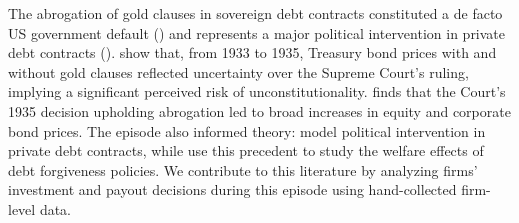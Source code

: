 The abrogation of gold clauses in sovereign debt contracts constituted a de facto US government default (\cite{Edwards2018}) and represents a major political intervention in private debt contracts (\cite{Bolton2002}). \cite{Edwards2015} show that, from 1933 to 1935, Treasury bond prices with and without gold clauses reflected uncertainty over the Supreme Court’s ruling, implying a significant perceived risk of unconstitutionality. \cite{Kroszner1999} finds that the Court's 1935 decision upholding abrogation led to broad increases in equity and corporate bond prices. The episode also informed theory: \citet{Bolton2002} model political intervention in private debt contracts, while \cite{Mian2014} use this precedent to study the welfare effects of debt forgiveness policies. We contribute to this literature by analyzing firms' investment and payout decisions during this episode using hand-collected firm-level data.